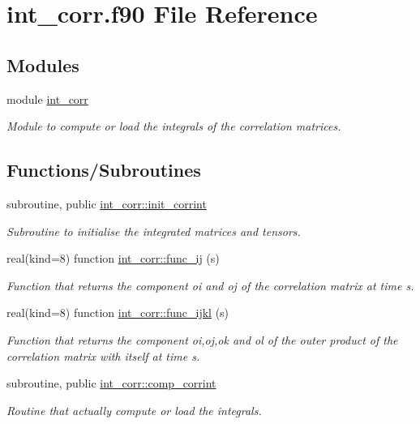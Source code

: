 \hypertarget{int__corr_8f90}{}\section{int\+\_\+corr.\+f90 File Reference}
\label{int__corr_8f90}
\subsection*{Modules}
\begin{DoxyCompactItemize}
\item 
module \hyperlink{namespaceint__corr}{int\+\_\+corr}
\begin{DoxyCompactList}\small\item\em Module to compute or load the integrals of the correlation matrices. \end{DoxyCompactList}\end{DoxyCompactItemize}
\subsection*{Functions/\+Subroutines}
\begin{DoxyCompactItemize}
\item 
subroutine, public \hyperlink{namespaceint__corr_afb525a8e7ea02313d6480ffbbd265b3b}{int\+\_\+corr\+::init\+\_\+corrint}
\begin{DoxyCompactList}\small\item\em Subroutine to initialise the integrated matrices and tensors. \end{DoxyCompactList}\item 
real(kind=8) function \hyperlink{namespaceint__corr_a311d5bd56c8de0d259e934f50d5388eb}{int\+\_\+corr\+::func\+\_\+ij} (s)
\begin{DoxyCompactList}\small\item\em Function that returns the component oi and oj of the correlation matrix at time s. \end{DoxyCompactList}\item 
real(kind=8) function \hyperlink{namespaceint__corr_af4796390cac83adc24081fa81a54af27}{int\+\_\+corr\+::func\+\_\+ijkl} (s)
\begin{DoxyCompactList}\small\item\em Function that returns the component oi,oj,ok and ol of the outer product of the correlation matrix with itself at time s. \end{DoxyCompactList}\item 
subroutine, public \hyperlink{namespaceint__corr_ac65d143c4217bb56f7c4168506c2fd4f}{int\+\_\+corr\+::comp\+\_\+corrint}
\begin{DoxyCompactList}\small\item\em Routine that actually compute or load the integrals. \end{DoxyCompactList}\end{DoxyCompactItemize}
